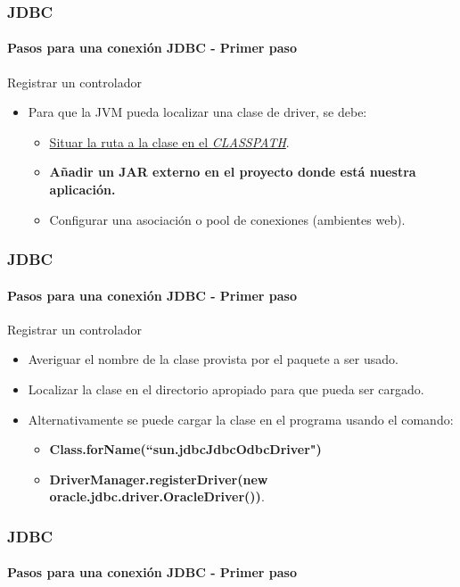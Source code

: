 \documentclass{beamer}
\begin{document}
    \begin{frame}
		\frametitle{JDBC}
		\framesubtitle{Pasos para una conexi\'on JDBC - Primer paso}

        \begin{exampleblock}{Registrar un controlador}
		    \begin{itemize}
		        \item Para que la JVM pueda localizar una clase de driver, se debe:
		        \begin{itemize}
		            \item \underline{Situar la ruta a la clase en el \emph{CLASSPATH}}.
		            \item \textbf{A\~nadir un JAR externo en el proyecto donde est\'a nuestra aplicaci\'on.}
		            \item Configurar una asociaci\'on o pool de conexiones (ambientes web).
		        \end{itemize}
		    \end{itemize}
		\end{exampleblock}
	\end{frame}	
	
	\begin{frame}
		\frametitle{JDBC}
		\framesubtitle{Pasos para una conexi\'on JDBC - Primer paso}

        \begin{exampleblock}{Registrar un controlador}
		    \begin{itemize}
		        \item Averiguar el nombre de la clase provista por el paquete a ser usado.
		        \item Localizar la clase en el directorio apropiado para que pueda ser cargado.
		        \item Alternativamente se puede cargar la clase en el programa usando el comando:
		        \begin{itemize}
		            \item \textbf{Class.forName(``sun.jdbcJdbcOdbcDriver")}
		            \item \textbf{DriverManager.registerDriver(new oracle.jdbc.driver.OracleDriver())}.
		        \end{itemize}
		    \end{itemize}
		\end{exampleblock}
	\end{frame}	
	
	\begin{frame}
		\frametitle{JDBC}
		\framesubtitle{Pasos para una conexi\'on JDBC - Primer paso}

               
	\end{frame}		
	
\end{document}
